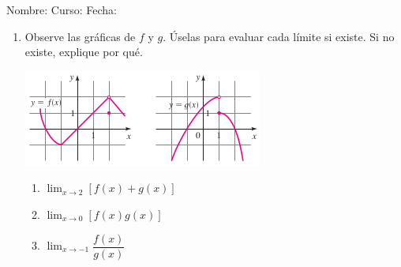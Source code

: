 \documentclass[letterpaper,fleqn]{article}
\newcommand{\LineaNombre}{%
\par
\vspace{\baselineskip}
Nombre:\hrulefill \; Curso: \underline{\hspace*{48pt}} \; Fecha: \underline{\hspace*{2.5cm}} \relax
\par}
\let\ds\displaystyle
\begin{document}
\LineaNombre
\begin{enumerate}
 \item Observe las gráficas de $f$ y $g$. Úselas para evaluar cada límite si existe. Si no existe, explique por qué.
\begin{center}
\includegraphics[scale=.8]{Images/funciones_fyg.png} 
\end{center}
\begin{enumerate}
\item $\ds{\lim_{x\rightarrow 2}}[f(x)+g(x)]$\noanswer
\item $\ds{\lim_{x\rightarrow 0}}[f(x)g(x)]$\noanswer
\item $\ds{\lim_{x\rightarrow -1}}\dfrac{f(x)}{g(x)}$\noanswer
\end{enumerate}
 \end{enumerate}
\end{document}
